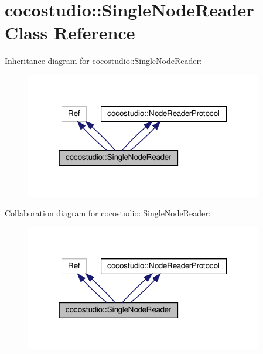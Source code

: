 \hypertarget{classcocostudio_1_1SingleNodeReader}{}\section{cocostudio\+:\+:Single\+Node\+Reader Class Reference}
\label{classcocostudio_1_1SingleNodeReader}


Inheritance diagram for cocostudio\+:\+:Single\+Node\+Reader\+:
\nopagebreak
\begin{figure}[H]
\begin{center}
\leavevmode
\includegraphics[width=295pt]{classcocostudio_1_1SingleNodeReader__inherit__graph}
\end{center}
\end{figure}


Collaboration diagram for cocostudio\+:\+:Single\+Node\+Reader\+:
\nopagebreak
\begin{figure}[H]
\begin{center}
\leavevmode
\includegraphics[width=295pt]{classcocostudio_1_1SingleNodeReader__coll__graph}
\end{center}
\end{figure}

